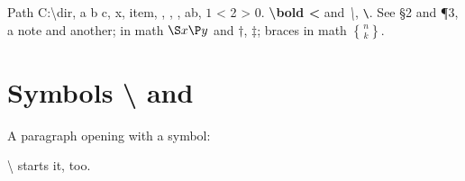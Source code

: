 \documentclass{article}
\begin{document}
Path C:\textbackslash{}dir, a \textbar{} b \textbardbl{} c, \textbraceleft x\textbraceright,
\textbullet{} item, \textdagger\textdaggerdbl, , ,
a\textperiodcentered b, $1$ \textless{} 2 \textgreater{} 0.
\textbf{\textbackslash bold \textless} and \textit{\textbackslash\textbar}, \texttt{\textbackslash}.
See \S 2 and \P 3, a note\dag{} and another\ddag; in math $\S x \P y$ and
$\dag$, $\ddag$; braces in math ${n \brace k}$.\par
\section{Symbols \textbackslash{} and \textbar}
A paragraph opening with a symbol: \par\textbackslash{} starts it,  too.
\end{document}
